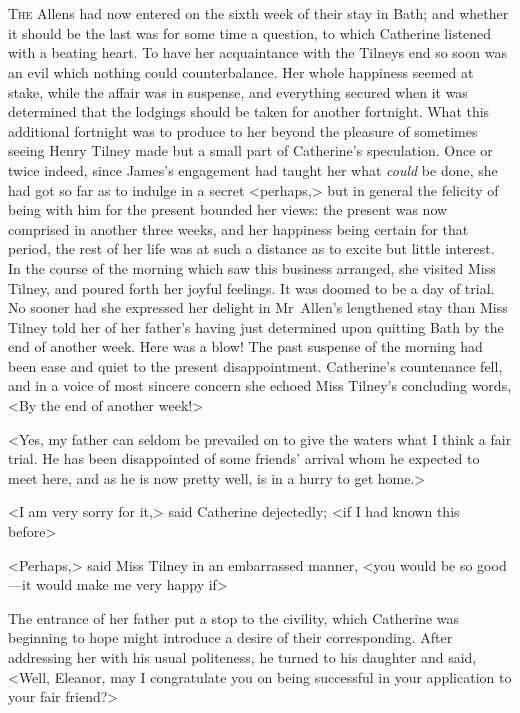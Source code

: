 \chapter[Chapter \thechapter]{} 

 \lettrine{T}{he} Allens had now entered on the sixth week of their stay in Bath; and whether it should be the last was for some time a question, to which Catherine listened with a beating heart. To have her acquaintance with the Tilneys end so soon was an evil which nothing could counterbalance. Her whole happiness seemed at stake, while the affair was in suspense, and everything secured when it was determined that the lodgings should be taken for another fortnight. What this additional fortnight was to produce to her beyond the pleasure of sometimes seeing Henry Tilney made but a small part of Catherine's speculation. Once or twice indeed, since James's engagement had taught her what \textit{could} be done, she had got so far as to indulge in a secret <perhaps,> but in general the felicity of being with him for the present bounded her views: the present was now comprised in another three weeks, and her happiness being certain for that period, the rest of her life was at such a distance as to excite but little interest. In the course of the morning which saw this business arranged, she visited Miss Tilney, and poured forth her joyful feelings. It was doomed to be a day of trial. No sooner had she expressed her delight in Mr~Allen's lengthened stay than Miss Tilney told her of her father's having just determined upon quitting Bath by the end of another week. Here was a blow! The past suspense of the morning had been ease and quiet to the present disappointment. Catherine's countenance fell, and in a voice of most sincere concern she echoed Miss Tilney's concluding words, <By the end of another week!> 

 <Yes, my father can seldom be prevailed on to give the waters what I think a fair trial. He has been disappointed of some friends' arrival whom he expected to meet here, and as he is now pretty well, is in a hurry to get home.> 

 <I am very sorry for it,> said Catherine dejectedly; <if I had known this before\longdash> 

 <Perhaps,> said Miss Tilney in an embarrassed manner, <you would be so good—it would make me very happy if\longdash> 

 The entrance of her father put a stop to the civility, which Catherine was beginning to hope might introduce a desire of their corresponding. After addressing her with his usual politeness, he turned to his daughter and said, <Well, Eleanor, may I congratulate you on being successful in your application to your fair friend?> 

